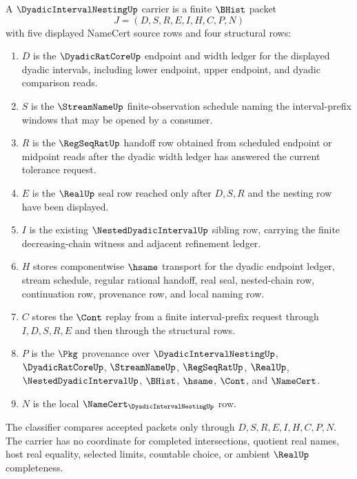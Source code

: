 \begin{definition}\label{def:dyadic-interval-nesting-carrier}
A $\DyadicIntervalNestingUp$ carrier is a finite $\BHist$ packet
$$
J=(D,S,R,E,I,H,C,P,N)
$$
with five displayed NameCert source rows and four structural rows:
\begin{enumerate}
\item $D$ is the $\DyadicRatCoreUp$ endpoint and width ledger for the displayed dyadic intervals, including lower endpoint, upper endpoint, and dyadic comparison reads.
\item $S$ is the $\StreamNameUp$ finite-observation schedule naming the interval-prefix windows that may be opened by a consumer.
\item $R$ is the $\RegSeqRatUp$ handoff row obtained from scheduled endpoint or midpoint reads after the dyadic width ledger has answered the current tolerance request.
\item $E$ is the $\RealUp$ seal row reached only after $D,S,R$ and the nesting row have been displayed.
\item $I$ is the existing $\NestedDyadicIntervalUp$ sibling row, carrying the finite decreasing-chain witness and adjacent refinement ledger.
\item $H$ stores componentwise $\hsame$ transport for the dyadic endpoint ledger, stream schedule, regular rational handoff, real seal, nested-chain row, continuation row, provenance row, and local naming row.
\item $C$ stores the $\Cont$ replay from a finite interval-prefix request through $I,D,S,R,E$ and then through the structural rows.
\item $P$ is the $\Pkg$ provenance over $\DyadicIntervalNestingUp$, $\DyadicRatCoreUp$, $\StreamNameUp$, $\RegSeqRatUp$, $\RealUp$, $\NestedDyadicIntervalUp$, $\BHist$, $\hsame$, $\Cont$, and $\NameCert$.
\item $N$ is the local $\NameCert_{\DyadicIntervalNestingUp}$ row.
\end{enumerate}
The classifier compares accepted packets only through $D,S,R,E,I,H,C,P,N$. The carrier has no coordinate for completed intersections, quotient real names, host real equality, selected limits, countable choice, or ambient $\RealUp$ completeness.
\end{definition}

